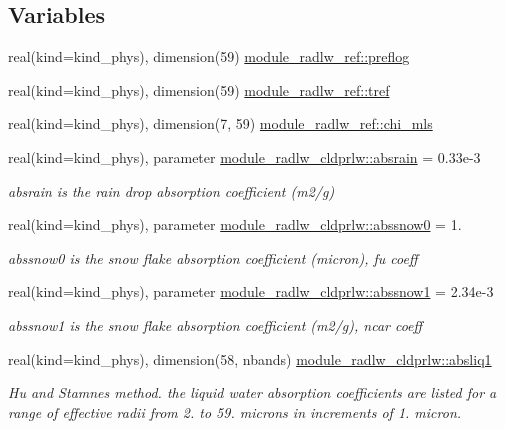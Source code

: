 \subsection*{Variables}
\begin{DoxyCompactItemize}
\item 
real(kind=kind\+\_\+phys), dimension(59) \hyperlink{group__module__radlw__main_ga4206f7320b6f1b59eb0132326263d2e4}{module\+\_\+radlw\+\_\+ref\+::preflog}
\item 
real(kind=kind\+\_\+phys), dimension(59) \hyperlink{group__module__radlw__main_ga56972f3948052e8b7f4717c192fc551d}{module\+\_\+radlw\+\_\+ref\+::tref}
\item 
real(kind=kind\+\_\+phys), dimension(7, 59) \hyperlink{group__module__radlw__main_gadc2bbd1ac0178afda84e74ad45404d31}{module\+\_\+radlw\+\_\+ref\+::chi\+\_\+mls}
\item 
real(kind=kind\+\_\+phys), parameter \hyperlink{group__module__radlw__main_ga04bff194fec27e0586ab1b4770319882}{module\+\_\+radlw\+\_\+cldprlw\+::absrain} = 0.\+33e-\/3
\begin{DoxyCompactList}\small\item\em absrain is the rain drop absorption coefficient (m2/g) \end{DoxyCompactList}\item 
real(kind=kind\+\_\+phys), parameter \hyperlink{group__module__radlw__main_ga4bcd58c6a7e9abdfbb8f8ec7d925d143}{module\+\_\+radlw\+\_\+cldprlw\+::abssnow0} = 1.
\begin{DoxyCompactList}\small\item\em abssnow0 is the snow flake absorption coefficient (micron), fu coeff \end{DoxyCompactList}\item 
real(kind=kind\+\_\+phys), parameter \hyperlink{group__module__radlw__main_ga7d12b328d9dec0c525a4b0824ae7ab44}{module\+\_\+radlw\+\_\+cldprlw\+::abssnow1} = 2.\+34e-\/3
\begin{DoxyCompactList}\small\item\em abssnow1 is the snow flake absorption coefficient (m2/g), ncar coeff \end{DoxyCompactList}\item 
real(kind=kind\+\_\+phys), dimension(58, nbands) \hyperlink{group__module__radlw__main_ga57896538226e9184c3750440d9f62166}{module\+\_\+radlw\+\_\+cldprlw\+::absliq1}
\begin{DoxyCompactList}\small\item\em Hu and Stamnes method. the liquid water absorption coefficients are listed for a range of effective radii from 2. to 59. microns in increments of 1. micron. \end{DoxyCompactList}\item 

\end{DoxyCompactItemize}

